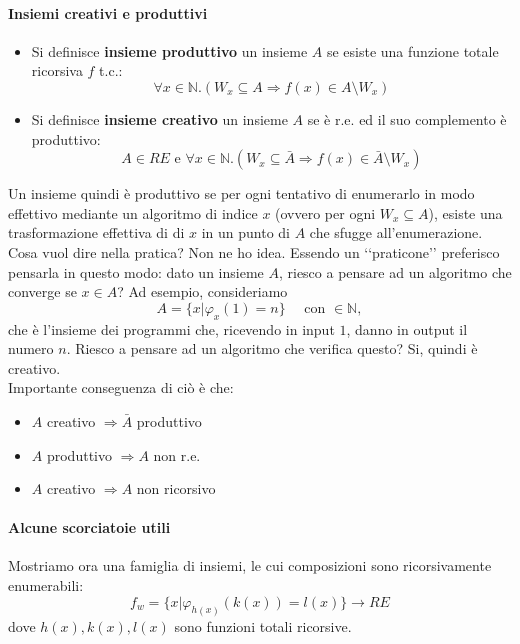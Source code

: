 \documentclass[a4paper,oneside]{scrbook}
\begin{document}
\paragraph{Insiemi creativi e produttivi}
\begin{itemize}
	\item Si definisce \textbf{insieme produttivo} un insieme $A$ se esiste una funzione totale ricorsiva $f$ t.c.:
	\begin{equation*}
		\forall x\in\mathbb{N}. (W_x \subseteq A \Rightarrow f(x)\in A \setminus W_x)
	\end{equation*}
	\item Si definisce \textbf{insieme creativo} un insieme $A$ se è r.e. ed il suo complemento è produttivo:
	\begin{equation*}
		A \in RE \text{ e } \forall x \in \mathbb{N}. (W_x \subseteq \bar{A} \Rightarrow f(x)\in\bar{A}\setminus W_x)
	\end{equation*}
\end{itemize}
Un insieme quindi è produttivo se per ogni tentativo di enumerarlo in modo effettivo mediante un algoritmo di indice $x$ (ovvero per ogni $W_x \subseteq A$),
esiste una trasformazione effettiva di di $x$ in un punto di $A$ che sfugge all'enumerazione. Cosa vuol dire nella pratica? Non ne ho idea.
Essendo un ‘‘praticone’’ preferisco pensarla in questo modo: dato un insieme $A$, riesco a pensare ad un algoritmo che converge se $x\in A$?
Ad esempio, consideriamo
$$A=\{x|\varphi_x(1)=n\} \quad \text{ con } \in\mathbb{N},$$
che è l'insieme dei programmi che, ricevendo in input $1$, danno in output il numero $n$. Riesco a pensare ad un algoritmo che verifica questo?
Si, quindi è creativo.\\
Importante conseguenza di ciò è che:
\begin{itemize}
	\item $A$ creativo $\Rightarrow \bar{A}$ produttivo
	\item $A$ produttivo $\Rightarrow A$ non r.e.
	\item $A$ creativo $\Rightarrow A$ non ricorsivo
\end{itemize}

\paragraph{Alcune scorciatoie utili}
Mostriamo ora una famiglia di insiemi, le cui composizioni sono ricorsivamente enumerabili:
\begin{equation*}
    f_w=\{x|\varphi_{h(x)}(k(x))=l(x)\} \rightarrow RE
\end{equation*}
dove $h(x), k(x), l(x)$ sono funzioni totali ricorsive.\\
\end{document}
